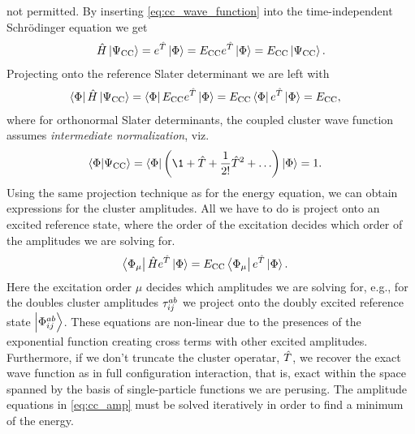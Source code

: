         not permitted.
        By inserting \autoref{eq:cc_wave_function} into the time-independent
        Schrödinger equation we get
        \begin{align}
            \hat{H}\ket{\Psi_{\text{CC}}}
            = e^{\hat{T}}\ket{\Phi}
            = E_{\text{CC}} e^{\hat{T}}\ket{\Phi}
            = E_{\text{CC}} \ket{\Psi_{\text{CC}}}.
        \end{align}
        Projecting onto the reference Slater determinant we are left with
        \begin{align}
            \bra{\Phi}\hat{H}\ket{\Psi_{\text{CC}}}
            &= \bra{\Phi}E_{\text{CC}} e^{\hat{T}}\ket{\Phi}
            = E_{\text{CC}} \bra{\Phi} e^{\hat{T}}\ket{\Phi}
            = E_{\text{CC}},
            \label{eq:cc_energy}
        \end{align}
        where for orthonormal Slater determinants, the coupled cluster wave
        function assumes \emph{intermediate normalization}, viz.
        \begin{align}
            \braket{\slat}{\cc}
            &= \bra{\slat}\para{
                \1 + \clust + \frac{1}{2!}\clust^2 + \dots
            }\ket{\slat}
            = 1.
        \end{align}
        Using the same projection technique as for the energy equation, we can
        obtain expressions for the cluster amplitudes.
        All we have to do is project onto an excited reference state, where the
        order of the excitation decides which order of the amplitudes we are
        solving for.
        \begin{align}
            \bra{\Phi_{\mu}}\hat{H} e^{\hat{T}}\ket{\Phi}
            &= E_{\text{CC}} \bra{\Phi_{\mu}} e^{\hat{T}}\ket{\Phi}.
            \label{eq:cc_amp}
        \end{align}
        Here the excitation order $\mu$ decides which amplitudes we are solving
        for, e.g., for the doubles cluster amplitudes $\tau^{ab}_{ij}$ we
        project onto the doubly excited reference state $\ket{\Phi^{ab}_{ij}}$.
        These equations are non-linear due to the presences of the exponential
        function creating cross terms with other excited amplitudes.
        Furthermore, if we don't truncate the cluster operatar, $\hat{T}$, we
        recover the exact wave function as in full configuration interaction,
        that is, exact within the space spanned by the basis of single-particle
        functions we are perusing.
        The amplitude equations in \autoref{eq:cc_amp} must be solved
        iteratively in order to find a minimum of the energy.

